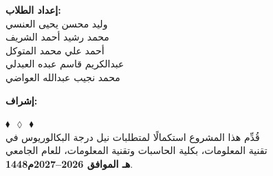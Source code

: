 \begin{titlepage}
\begin{center}
\vspace{4.2cm}

\begin{minipage}[t]{0.48\textwidth}
  \centering
  {\large \textbf{\color{kauprimary}إعداد الطلاب:}}\\[8pt]
  {\large وليد محسن يحيى العنسي}\\[4pt]
  {\large محمد رشيد أحمد الشريف}\\[4pt]
  {\large أحمد علي محمد المتوكل}\\[4pt]
  {\large عبدالكريم قاسم عبده العبدلي}\\[4pt]
  {\large محمد نجيب عبدالله العواضي}
\end{minipage}%
\hfill
\begin{minipage}[t]{0.48\textwidth}
  \centering
  {\large \textbf{\color{kauprimary}إشراف:}}\\[12pt] 
  {\Large \textbf{\thesisSupervisorAR}}
\end{minipage}

\vspace{0.4cm}

{\Huge \color{kauprimary} \textbf{$\blacklozenge \ \ \lozenge \ \ \blacklozenge$}}\\[10pt]

{\small قُدِّم هذا المشروع استكمالًا لمتطلبات نيل درجة البكالوريوس في\\
تقنية المعلومات، بكلية الحاسبات وتقنية المعلومات، للعام الجامعي\\[6pt]
\textbf{\large 1448هـ الموافق 2026--2027م}.}
\end{center}
\end{titlepage}
